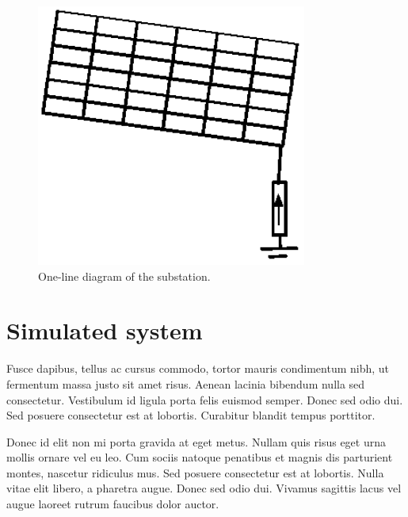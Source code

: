 \documentclass[journal]{../template/IEEEtran}
\begin{document}
\begin{figure}[b]
	\centering
		\includegraphics[width=3.5in]{../resources/image.eps}
		\caption{One-line diagram of the substation.}
	\label{fig:substationdiagram}
\end{figure}

\section{Simulated system}

Fusce dapibus, tellus ac cursus commodo, tortor mauris condimentum nibh, ut fermentum massa justo sit amet risus. Aenean lacinia bibendum nulla sed consectetur. Vestibulum id ligula porta felis euismod semper. Donec sed odio dui. Sed posuere consectetur est at lobortis. Curabitur blandit tempus porttitor.

Donec id elit non mi porta gravida at eget metus. Nullam quis risus eget urna mollis ornare vel eu leo. Cum sociis natoque penatibus et magnis dis parturient montes, nascetur ridiculus mus. Sed posuere consectetur est at lobortis. Nulla vitae elit libero, a pharetra augue. Donec sed odio dui. Vivamus sagittis lacus vel augue laoreet rutrum faucibus dolor auctor.
\end{document}
